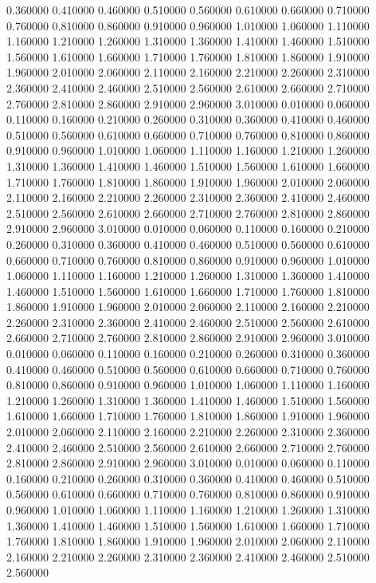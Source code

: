 0.360000
0.410000
0.460000
0.510000
0.560000
0.610000
0.660000
0.710000
0.760000
0.810000
0.860000
0.910000
0.960000
1.010000
1.060000
1.110000
1.160000
1.210000
1.260000
1.310000
1.360000
1.410000
1.460000
1.510000
1.560000
1.610000
1.660000
1.710000
1.760000
1.810000
1.860000
1.910000
1.960000
2.010000
2.060000
2.110000
2.160000
2.210000
2.260000
2.310000
2.360000
2.410000
2.460000
2.510000
2.560000
2.610000
2.660000
2.710000
2.760000
2.810000
2.860000
2.910000
2.960000
3.010000
0.010000
0.060000
0.110000
0.160000
0.210000
0.260000
0.310000
0.360000
0.410000
0.460000
0.510000
0.560000
0.610000
0.660000
0.710000
0.760000
0.810000
0.860000
0.910000
0.960000
1.010000
1.060000
1.110000
1.160000
1.210000
1.260000
1.310000
1.360000
1.410000
1.460000
1.510000
1.560000
1.610000
1.660000
1.710000
1.760000
1.810000
1.860000
1.910000
1.960000
2.010000
2.060000
2.110000
2.160000
2.210000
2.260000
2.310000
2.360000
2.410000
2.460000
2.510000
2.560000
2.610000
2.660000
2.710000
2.760000
2.810000
2.860000
2.910000
2.960000
3.010000
0.010000
0.060000
0.110000
0.160000
0.210000
0.260000
0.310000
0.360000
0.410000
0.460000
0.510000
0.560000
0.610000
0.660000
0.710000
0.760000
0.810000
0.860000
0.910000
0.960000
1.010000
1.060000
1.110000
1.160000
1.210000
1.260000
1.310000
1.360000
1.410000
1.460000
1.510000
1.560000
1.610000
1.660000
1.710000
1.760000
1.810000
1.860000
1.910000
1.960000
2.010000
2.060000
2.110000
2.160000
2.210000
2.260000
2.310000
2.360000
2.410000
2.460000
2.510000
2.560000
2.610000
2.660000
2.710000
2.760000
2.810000
2.860000
2.910000
2.960000
3.010000
0.010000
0.060000
0.110000
0.160000
0.210000
0.260000
0.310000
0.360000
0.410000
0.460000
0.510000
0.560000
0.610000
0.660000
0.710000
0.760000
0.810000
0.860000
0.910000
0.960000
1.010000
1.060000
1.110000
1.160000
1.210000
1.260000
1.310000
1.360000
1.410000
1.460000
1.510000
1.560000
1.610000
1.660000
1.710000
1.760000
1.810000
1.860000
1.910000
1.960000
2.010000
2.060000
2.110000
2.160000
2.210000
2.260000
2.310000
2.360000
2.410000
2.460000
2.510000
2.560000
2.610000
2.660000
2.710000
2.760000
2.810000
2.860000
2.910000
2.960000
3.010000
0.010000
0.060000
0.110000
0.160000
0.210000
0.260000
0.310000
0.360000
0.410000
0.460000
0.510000
0.560000
0.610000
0.660000
0.710000
0.760000
0.810000
0.860000
0.910000
0.960000
1.010000
1.060000
1.110000
1.160000
1.210000
1.260000
1.310000
1.360000
1.410000
1.460000
1.510000
1.560000
1.610000
1.660000
1.710000
1.760000
1.810000
1.860000
1.910000
1.960000
2.010000
2.060000
2.110000
2.160000
2.210000
2.260000
2.310000
2.360000
2.410000
2.460000
2.510000
2.560000
